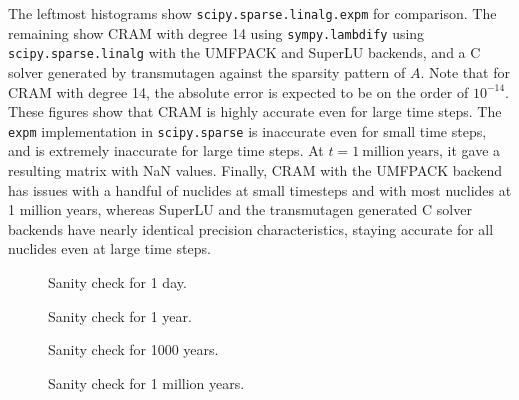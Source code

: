 The leftmost histograms show
\texttt{scipy.\allowbreak{}sparse.\allowbreak{}linalg.\allowbreak{}expm} for
comparison. The remaining show CRAM with degree 14 using
\texttt{sympy.\allowbreak{}lambdify} using
\texttt{scipy.\allowbreak{}sparse.\allowbreak{}linalg} with the UMFPACK and
SuperLU backends, and a C solver generated by transmutagen against the
sparsity pattern of $A$. Note that for CRAM with degree 14, the absolute error
is expected to be on the order of $10^{-14}$. These figures show that CRAM is
highly accurate even for large time steps. The \texttt{expm} implementation in
\texttt{scipy.\allowbreak{}sparse} is inaccurate even for small time steps,
and is extremely inaccurate for large time steps. At
$t = 1 \mathrm{\ million\ years}$, it gave a resulting matrix with NaN values.
Finally, CRAM with the UMFPACK backend has issues with a handful of nuclides
at small timesteps and with most nuclides at 1 million years, whereas SuperLU
and the transmutagen generated C solver backends have nearly identical
precision characteristics, staying accurate for all nuclides even at large
time steps.

\begin{figure}[!ht]
\centering
\resizebox{0.9\textwidth}{!}{}
\caption{Sanity check for 1 day.}
\label{fig:nofission-pwru50-1-day}
\end{figure}

\begin{figure}[!ht]
\centering
\resizebox{0.9\textwidth}{!}{}
\caption{Sanity check for 1 year.}
\label{fig:nofission-pwru50-1-year}
\end{figure}

\begin{figure}[!ht]
\centering
\resizebox{0.9\textwidth}{!}{}
\caption{Sanity check for 1000 years.}
\label{fig:nofission-pwru50-1000-years}
\end{figure}

\begin{figure}[!ht]
\centering
\resizebox{0.9\textwidth}{!}{}
\caption{Sanity check for 1 million years.}
\label{fig:nofission-pwru50-1-million-years}
\end{figure}
